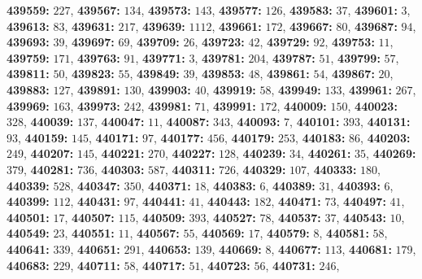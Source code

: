 \textsf{\bfseries 439559:} $227$, \textsf{\bfseries 439567:} $134$, \textsf{\bfseries 439573:} $143$, \textsf{\bfseries 439577:} $126$, \textsf{\bfseries 439583:} $37$, \textsf{\bfseries 439601:} $3$, \textsf{\bfseries 439613:} $83$, \textsf{\bfseries 439631:} $217$, \textsf{\bfseries 439639:} $1112$, \textsf{\bfseries 439661:} $172$, \textsf{\bfseries 439667:} $80$, \textsf{\bfseries 439687:} $94$, \textsf{\bfseries 439693:} $39$, \textsf{\bfseries 439697:} $69$, \textsf{\bfseries 439709:} $26$, \textsf{\bfseries 439723:} $42$, \textsf{\bfseries 439729:} $92$, \textsf{\bfseries 439753:} $11$, \textsf{\bfseries 439759:} $171$, \textsf{\bfseries 439763:} $91$, \textsf{\bfseries 439771:} $3$, \textsf{\bfseries 439781:} $204$, \textsf{\bfseries 439787:} $51$, \textsf{\bfseries 439799:} $57$, \textsf{\bfseries 439811:} $50$, \textsf{\bfseries 439823:} $55$, \textsf{\bfseries 439849:} $39$, \textsf{\bfseries 439853:} $48$, \textsf{\bfseries 439861:} $54$, \textsf{\bfseries 439867:} $20$, \textsf{\bfseries 439883:} $127$, \textsf{\bfseries 439891:} $130$, \textsf{\bfseries 439903:} $40$, \textsf{\bfseries 439919:} $58$, \textsf{\bfseries 439949:} $133$, \textsf{\bfseries 439961:} $267$, \textsf{\bfseries 439969:} $163$, \textsf{\bfseries 439973:} $242$, \textsf{\bfseries 439981:} $71$, \textsf{\bfseries 439991:} $172$, \textsf{\bfseries 440009:} $150$, \textsf{\bfseries 440023:} $328$, \textsf{\bfseries 440039:} $137$, \textsf{\bfseries 440047:} $11$, \textsf{\bfseries 440087:} $343$, \textsf{\bfseries 440093:} $7$, \textsf{\bfseries 440101:} $393$, \textsf{\bfseries 440131:} $93$, \textsf{\bfseries 440159:} $145$, \textsf{\bfseries 440171:} $97$, \textsf{\bfseries 440177:} $456$, \textsf{\bfseries 440179:} $253$, \textsf{\bfseries 440183:} $86$, \textsf{\bfseries 440203:} $249$, \textsf{\bfseries 440207:} $145$, \textsf{\bfseries 440221:} $270$, \textsf{\bfseries 440227:} $128$, \textsf{\bfseries 440239:} $34$, \textsf{\bfseries 440261:} $35$, \textsf{\bfseries 440269:} $379$, \textsf{\bfseries 440281:} $736$, \textsf{\bfseries 440303:} $587$, \textsf{\bfseries 440311:} $726$, \textsf{\bfseries 440329:} $107$, \textsf{\bfseries 440333:} $180$, \textsf{\bfseries 440339:} $528$, \textsf{\bfseries 440347:} $350$, \textsf{\bfseries 440371:} $18$, \textsf{\bfseries 440383:} $6$, \textsf{\bfseries 440389:} $31$, \textsf{\bfseries 440393:} $6$, \textsf{\bfseries 440399:} $112$, \textsf{\bfseries 440431:} $97$, \textsf{\bfseries 440441:} $41$, \textsf{\bfseries 440443:} $182$, \textsf{\bfseries 440471:} $73$, \textsf{\bfseries 440497:} $41$, \textsf{\bfseries 440501:} $17$, \textsf{\bfseries 440507:} $115$, \textsf{\bfseries 440509:} $393$, \textsf{\bfseries 440527:} $78$, \textsf{\bfseries 440537:} $37$, \textsf{\bfseries 440543:} $10$, \textsf{\bfseries 440549:} $23$, \textsf{\bfseries 440551:} $11$, \textsf{\bfseries 440567:} $55$, \textsf{\bfseries 440569:} $17$, \textsf{\bfseries 440579:} $8$, \textsf{\bfseries 440581:} $58$, \textsf{\bfseries 440641:} $339$, \textsf{\bfseries 440651:} $291$, \textsf{\bfseries 440653:} $139$, \textsf{\bfseries 440669:} $8$, \textsf{\bfseries 440677:} $113$, \textsf{\bfseries 440681:} $179$, \textsf{\bfseries 440683:} $229$, \textsf{\bfseries 440711:} $58$, \textsf{\bfseries 440717:} $51$, \textsf{\bfseries 440723:} $56$, \textsf{\bfseries 440731:} $246$, 
